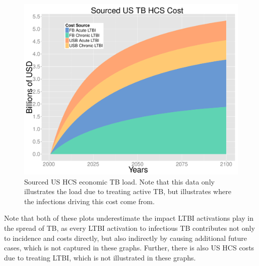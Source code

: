 \documentclass{amsart}
\begin{document}
\begin{figure}[h]
  \begin{center}
    \includegraphics[scale=.35]{costPlotSourced}
  \end{center}
  \caption{Sourced US HCS economic TB load. Note that this data only illustrates
    the load due to treating active TB, but illustrates where the infections
    driving this cost come from.}
  \label{fig:costPlotSourced}
\end{figure}
Note that both of these plots underestimate the impact LTBI activations play in
the spread of TB, as every LTBI activation to infectious TB contributes not only
to incidence and costs directly, but also indirectly by causing additional
future cases, which is not captured in these graphs. Further, there is also US
HCS costs due to treating LTBI, which is not illustrated in these graphs. 
\end{document}
